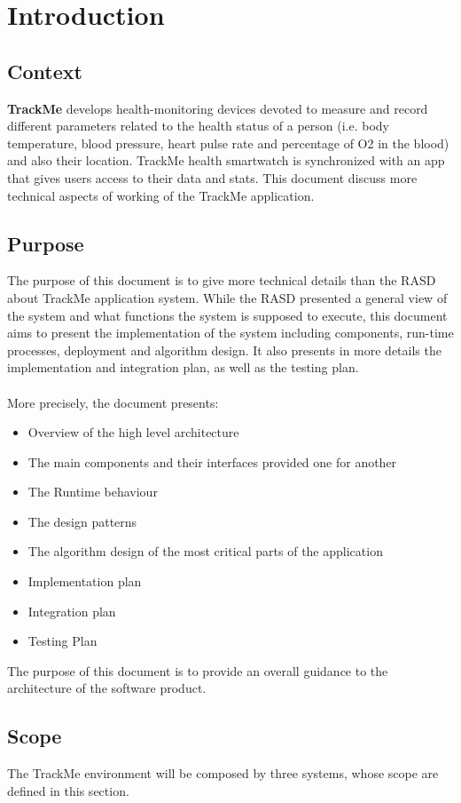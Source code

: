 \documentclass[a4paper, hidelinks, 12pt]{report}
\begin{document}
	\chapter{Introduction}
	\section{Context}
	\textbf{TrackMe} develops health-monitoring devices devoted to measure and record different parameters related to the health status of a person (i.e. body temperature, blood pressure, heart pulse rate and percentage of O2 in the blood) and also their location. TrackMe health smartwatch is synchronized with an app that gives users access to their data and stats. This document discuss more technical aspects of working of the TrackMe application.
	
	\section{Purpose}
	The purpose of this document is to give more technical details than the RASD about TrackMe application system. While the RASD presented a general view of the system and what functions the system is supposed to execute, this document aims to present the implementation of the system including components, run-time processes, deployment and algorithm design. It also presents in more details the implementation and integration plan, as well as the testing plan.\\\\
More precisely, the document presents:
\begin{itemize}
		\item{}Overview of the high level architecture
		\item{}The main components and their interfaces provided one for another
		\item{}The Runtime behaviour
		\item{}The design patterns
		\item{}The algorithm design of the most critical parts of the application
		\item{}Implementation plan
		\item{}Integration plan
		\item{}Testing Plan
	\end{itemize}
The purpose of this document is to provide an overall guidance to the architecture of the software product.
		
	\section{Scope}
	The TrackMe environment will be composed by three systems, whose scope are defined in this section. \\
	
\end{document}
